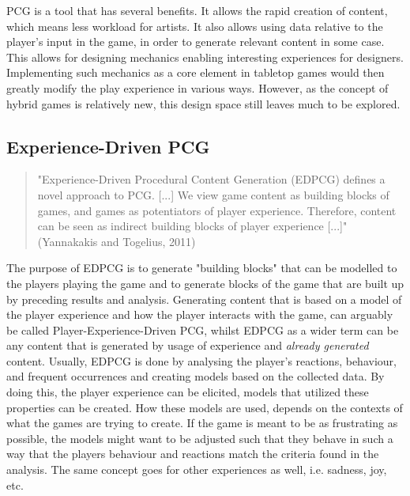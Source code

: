 PCG is a tool that has several benefits. It allows the rapid creation of content, which means less workload for artists. It also allows using data relative to the player's input in the game, in order to generate relevant content in some case. This allows for designing mechanics enabling interesting experiences for designers. Implementing such mechanics as a core element in tabletop games would then greatly modify the play experience in various ways. However, as the concept of hybrid games is relatively new, this design space still leaves much to be explored.

\subsection{Experience-Driven PCG}
\begin{quotation} 
"Experience-Driven Procedural Content Generation (EDPCG) defines a novel approach to PCG. [...] We view game content as building blocks of games, and games as potentiators of player experience. Therefore, content can be seen as indirect building blocks of player experience [...]" (Yannakakis and Togelius, 2011) \cite{art:edpcg}
\end{quotation}

The purpose of EDPCG is to generate "building blocks" that can be modelled to the players playing the game and to generate blocks of the game that are built up by preceding results and analysis. Generating content that is based on a model of the player experience and how the player interacts with the game, can arguably be called Player-Experience-Driven PCG, whilst EDPCG as a wider term can be any content that is generated by usage of experience and \textit{already generated} content. Usually, EDPCG is done by analysing the player's reactions, behaviour, and frequent occurrences and creating models based on the collected data. By doing this, the player experience can be elicited, models that utilized these properties can be created. How these models are used, depends on the contexts of what the games are trying to create. If the game is meant to be as frustrating as possible, the models might want to be adjusted such that they behave in such a way that the players behaviour and reactions match the criteria found in the analysis. The same concept goes for other experiences as well, i.e. sadness, joy, etc.

